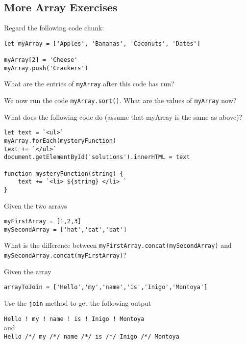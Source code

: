 \documentclass[11pt,a4paper]{report}
\begin{document}
\printcursols


\newpage

\subsection{More Array Exercises}
\begin{ex}
Regard the following code chunk:
\begin{verbatim}
let myArray = ['Apples', 'Bananas', 'Coconuts', 'Dates']

myArray[2] = 'Cheese'
myArray.push('Crackers')
\end{verbatim}
What are the entries of \verb|myArray| after this code has run?
\end{ex}

\begin{ex}
We now run the code \verb|myArray.sort()|. What are the values of \verb|myArray| now?
\end{ex}

\begin{ex}
What does the following code do (assume that myArray is the same as above)?
\begin{verbatim}
let text = `<ul>`
myArray.forEach(mysteryFunction) 
text += `</ul>`
document.getElementById('solutions').innerHTML = text

function mysteryFunction(string) {
    text += `<li> ${string} </li> `
}
\end{verbatim}
\end{ex}

\begin{ex}
Given the two arrays
\begin{verbatim}
myFirstArray = [1,2,3]
mySecondArray = ['hat','cat','bat']
\end{verbatim}
What is the difference between \verb|myFirstArray.concat(mySecondArray)| and \verb|mySecondArray.concat(myFirstArray)|?
\end{ex}

\begin{ex}
Given the array 

\verb|arrayToJoin = ['Hello','my','name','is','Inigo','Montoya']|

Use the \verb|join| method to get the following output

\verb|Hello ! my ! name ! is ! Inigo ! Montoya|\\
and \\
\verb|Hello /*/ my /*/ name /*/ is /*/ Inigo /*/ Montoya|
\end{ex}
\end{document}
